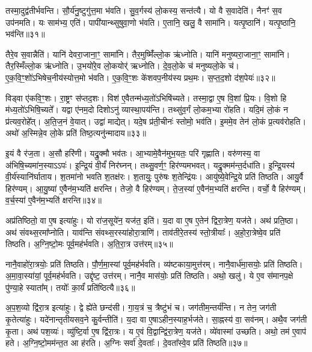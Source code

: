 तस्मा॒दुद्व॑तीर्भवन्ति।
सौ॒र्य॑नु॒ष्टुगु॑त्त॒मा भ॑वति।
सु॒व॒र्गस्य॑ लो॒कस्य॒ सन्त॑त्यै।
यो वै स॒वादेति॑।
नैनꣳ॑ स॒व उप॑नमति।
यः साम॑भ्य॒ एति॑।
पापी॑यान्थ्सुषुवा॒णो भ॑वति।
ए॒तानि॒ खलु॒ वै सामा॑नि।
यत्पृ॒ष्ठानि॑।
यत्पृ॒ष्ठानि॒ भव॑न्ति॥३१॥

तैरे॒व स॒वान्नैति॑।
यानि॑ देवरा॒जाना॒ꣳ॒ सामा॑नि।
तैर॒मुष्मिँ॑ल्लो॒क ऋ॑ध्नोति।
यानि॑ मनुष्यरा॒जाना॒ꣳ॒ सामा॑नि।
तैर॒स्मिँल्लो॒क ऋ॑ध्नोति।
उ॒भयो॑रे॒व लो॒कयोर्॑ ऋध्नोति।
दे॒व॒लो॒के च॑ मनुष्यलो॒के च॑।
ए॒क॒वि॒ꣳ॒शो॑\-ऽभिषेच॒नीय॑स्योत्त॒मो भ॑वति।
ए॒क॒वि॒ꣳ॒शः के॑शवप॒नीय॑स्य प्रथ॒मः।
स॒प्त॒द॒शो द॑श॒पेयः॑॥३२॥

विड्वा ए॑कवि॒ꣳ॒शः।
रा॒ष्ट्रꣳ स॑प्तद॒शः।
विश॑ ए॒वैतन्म॑ध्य॒तो॑\-ऽभिषि॑च्यते।
तस्मा॒द्वा ए॒ष वि॒शां प्रि॒यः।
वि॒शो हि म॑ध्य॒तो॑\-ऽभिषि॒च्यते᳚।
यद्वा ए॑नम॒दो दिशोऽनु॑ व्यास्था॒पय॑न्ति।
तथ्सु॑व॒र्गं लो॒कम॒भ्या रो॑हति।
यदि॒मं लो॒कं न प्र॑त्यव॒रोहे᳚त्।
अ॒ति॒ज॒नं वे॒यात्।
उद्वा॑ माद्येत्।
यदे॒ष प्र॑ती॒चीनः॑ स्तोमो॒ भव॑ति।
इ॒ममे॒व तेन॑ लो॒कं प्र॒त्यव॑रोहति।
अथो॑ अ॒स्मिन्ने॒व लो॒के प्रति॑ तिष्ठ॒त्यनु॑न्मादाय॥३३॥\anuvakamend[अक्र॑न्राज॒न्यो॑ भव॑न्ति दश॒पेयो॑ माद्ये॒त्त्रीणि॑ च]

इ॒यं वै र॑ज॒ता।
अ॒सौ हरि॑णी।
यद्रु॒क्मौ भव॑तः।
आ॒भ्यामे॒वैन॑मुभ॒यतः॒ परि॑ गृह्णाति।
वरु॑णस्य॒ वा अ॑भिषि॒च्यमा॑न॒स्या\-ऽऽपः॑।
इ॒न्द्रि॒यं वी॒र्यं॑ निर॑घ्नन्।
तथ्सु॒वर्ण॒ꣳ॒ हिर॑ण्यमभवत्।
यद्रु॒क्मम॑न्त॒र्द\-धा॑ति।
इ॒न्द्रि॒यस्य॑ वी॒र्य॑स्या\-नि॑र्घाताय।
श॒तमा॑नो भवति श॒तक्ष॑रः।
श॒तायुः॒ पुरु॑षः श॒तेन्द्रि॑यः।
आयु॑ष्ये॒वेन्द्रि॒ये प्रति॑ तिष्ठति।
आयु॒र्वै हिर॑ण्यम्।
आ॒यु॒ष्या॑ ए॒वैन॑म॒भ्यति॑ क्षरन्ति।
तेजो॒ वै हिर॑ण्यम्।
ते॒ज॒स्या॑ ए॒वैन॑म॒भ्यति॑ क्षरन्ति।
वर्चो॒ वै हिर॑ण्यम्।
व॒र्च॒स्या॑ ए॒वैन॑म॒भ्यति॑ क्षरन्ति॥३४॥\anuvakamend[श॒तक्ष॑रो॒\-ऽष्टौ च॑]

अप्र॑तिष्ठितो॒ वा ए॒ष इत्या॑हुः।
यो रा॑ज॒सूये॑न॒ यज॑त॒ इति॑।
य॒दा वा ए॒ष ए॒तेन॑ द्विरा॒त्रेण॒ यज॑ते।
अथ॑ प्रति॒ष्ठा।
अथ॑ संवथ्स॒रमा᳚प्नोति।
याव॑न्ति संवथ्स॒रस्या॑होरा॒त्राणि॑।
ताव॑तीरे॒तस्य॑ स्तो॒त्रीयाः᳚।
अ॒हो॒रा॒त्रेष्वे॒व प्रति॑ तिष्ठति।
अ॒ग्नि॒ष्टो॒मः पूर्व॒मह॑र्भवति।
अ॒ति॒रा॒त्र उत्त॑रम्॥३५॥

नानै॒वाहो॑रा॒त्रयोः॒ प्रति॑ तिष्ठति।
पौ॒र्ण॒मा॒स्यां पूर्व॒मह॑र्भवति।
व्य॑ष्टकाया॒मुत्त॑रम्।
नानै॒वार्ध॑मा॒सयोः॒ प्रति॑ तिष्ठति।
अ॒मा॒वा॒स्या॑यां॒ पूर्व॒मह॑र्भवति।
उद्दृ॑ष्ट॒ उत्त॑रम्।
नानै॒व मास॑योः॒ प्रति॑ तिष्ठति।
अथो॒ खलु॑।
ये ए॒व स॑मानप॒क्षे पु॑ण्या॒हे स्याता᳚म्।
तयोः᳚ का॒र्यं॑ प्रति॑\-ष्ठित्यै॥३६॥

अ॒प॒श॒व्यो द्वि॑रा॒त्र इत्या॑हुः।
द्वे ह्ये॑ते छन्द॑सी।
गा॒य॒त्रं च॒ त्रैष्टु॑भं च।
जग॑तीम॒न्तर्य॑न्ति।
न तेन॒ जग॑ती कृ॒तेत्या॑हुः।
यदे॑नान्तृतीयसव॒ने कु॒र्वन्तीति॑।
य॒दा वा ए॒षा\-ऽहीन॒स्याह॒र्भज॑ते।
सा॒ह्नस्य॑ वा॒ सव॑नम्।
अथै॒व जग॑ती कृ॒ता।
अथ॑ पश॒व्यः॑।
व्यु॑ष्टि॒र्वा ए॒ष द्वि॑रा॒त्रः।
य ए॒वं वि॒द्वान्द्वि॑रा॒त्रेण॒ यज॑ते।
व्ये॑वास्मा॑ उच्छति।
अथो॒ तम॑ ए॒वाप॑ हते।
अ॒ग्नि॒ष्टो॒मम॑न्त॒त आ ह॑रति।
अ॒ग्निः सर्वा॑ दे॒वताः᳚।
दे॒वता᳚स्वे॒व प्रति॑ तिष्ठति॥३७॥\anuvakamend[उत्त॑रं॒ प्रति॑\-ष्ठित्यै पश॒व्यः॑ स॒प्त च॑]

